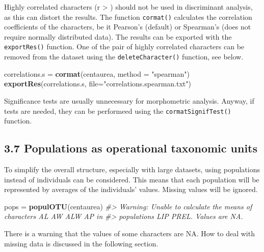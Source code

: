 \documentclass[
]{article}
\newenvironment{Shaded}{\begin{snugshade}}{\end{snugshade}}
\newcommand{\CommentTok}[1]{\textcolor[rgb]{0.56,0.35,0.01}{\textit{#1}}}
\newcommand{\DataTypeTok}[1]{\textcolor[rgb]{0.13,0.29,0.53}{#1}}
\newcommand{\KeywordTok}[1]{\textcolor[rgb]{0.13,0.29,0.53}{\textbf{#1}}}
\newcommand{\NormalTok}[1]{#1}
\newcommand{\StringTok}[1]{\textcolor[rgb]{0.31,0.60,0.02}{#1}}
\begin{document}
Highly correlated characters (r \textgreater{} \textbar)
should not be used in discriminant analysis, as this can distort the
results. The function \texttt{cormat()} calculates the correlation
coefficients of the characters, be it Pearson's (default) or Spearman's
(does not require normally distributed data). The results can be
exported with the \texttt{exportRes()} function. One of the pair of
highly correlated characters can be removed from the dataset using the
\texttt{deleteCharacter()} function, see below.

\begin{Shaded}
\begin{Highlighting}[]
\NormalTok{correlations.s =}\StringTok{ }\KeywordTok{cormat}\NormalTok{(centaurea, }\DataTypeTok{method =} \StringTok{"spearman"}\NormalTok{)}
\KeywordTok{exportRes}\NormalTok{(correlations.s, }\DataTypeTok{file=}\StringTok{"correlations.spearman.txt"}\NormalTok{)}
\end{Highlighting}
\end{Shaded}

Significance tests are usually unnecessary for morphometric analysis.
Anyway, if tests are needed, they can be performeed using the
\texttt{cormatSignifTest()} function.

\hypertarget{populations-as-operational-taxonomic-units}{%
\subsection{3.7 Populations as operational taxonomic
units}\label{populations-as-operational-taxonomic-units}}

To simplify the overall structure, especially with large datasets, using
populations instead of individuals can be considered. This means that
each population will be represented by averages of the individuals'
values. Missing values will be ignored.

\begin{Shaded}
\begin{Highlighting}[]
\NormalTok{pops =}\StringTok{ }\KeywordTok{populOTU}\NormalTok{(centaurea)}
\CommentTok{#> Warning: Unable to calculate the means of characters AL AW ALW AP in}
\CommentTok{#> populations LIP PREL. Values are NA.}
\end{Highlighting}
\end{Shaded}

There is a warning that the values of some characters are NA. How to
deal with missing data is discussed in the following section.
\end{document}
